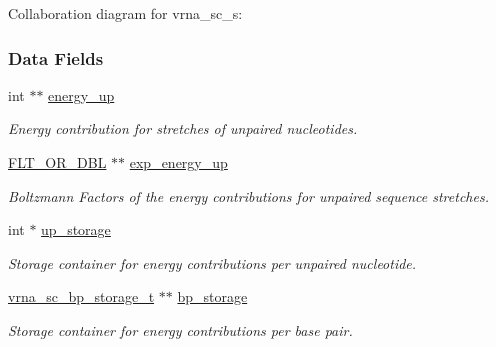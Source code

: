Collaboration diagram for vrna\+\_\+sc\+\_\+s\+:
\subsubsection*{Data Fields}
\begin{DoxyCompactItemize}
\item 
\mbox{\label{group__soft__constraints_a57e4dbb924ab11f304e3762a3a9b07a1}} 
int $\ast$$\ast$ \mbox{\hyperlink{group__soft__constraints_a57e4dbb924ab11f304e3762a3a9b07a1}{energy\+\_\+up}}
\begin{DoxyCompactList}\small\item\em Energy contribution for stretches of unpaired nucleotides. \end{DoxyCompactList}\item 
\mbox{\label{group__soft__constraints_ad3b4972d3b6c23865587e4ac56a37375}} 
\mbox{\hyperlink{group__data__structures_ga31125aeace516926bf7f251f759b6126}{F\+L\+T\+\_\+\+O\+R\+\_\+\+D\+BL}} $\ast$$\ast$ \mbox{\hyperlink{group__soft__constraints_ad3b4972d3b6c23865587e4ac56a37375}{exp\+\_\+energy\+\_\+up}}
\begin{DoxyCompactList}\small\item\em Boltzmann Factors of the energy contributions for unpaired sequence stretches. \end{DoxyCompactList}\item 
\mbox{\label{group__soft__constraints_a16c564d3170b7357620860de1e5faed6}} 
int $\ast$ \mbox{\hyperlink{group__soft__constraints_a16c564d3170b7357620860de1e5faed6}{up\+\_\+storage}}
\begin{DoxyCompactList}\small\item\em Storage container for energy contributions per unpaired nucleotide. \end{DoxyCompactList}\item 
\mbox{\label{group__soft__constraints_a8e261e29462f6bdba3259e5eb61e48e8}} 
\mbox{\hyperlink{structvrna__sc__bp__storage__t}{vrna\+\_\+sc\+\_\+bp\+\_\+storage\+\_\+t}} $\ast$$\ast$ \mbox{\hyperlink{group__soft__constraints_a8e261e29462f6bdba3259e5eb61e48e8}{bp\+\_\+storage}}
\begin{DoxyCompactList}\small\item\em Storage container for energy contributions per base pair. \end{DoxyCompactList}\item 
$$
\end{DoxyCompactItemize}
